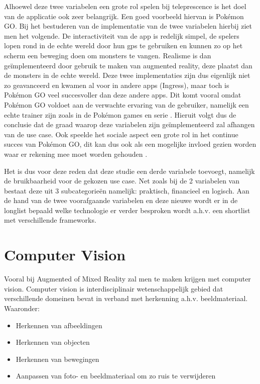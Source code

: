 Alhoewel deze twee variabelen een grote rol spelen bij teleprescence is het doel van de applicatie ook zeer belangrijk. Een goed voorbeeld hiervan is Pokémon GO. Bij het bestuderen van de implementatie van de twee variabelen hierbij ziet men het volgende. De interactiviteit van de app is redelijk simpel, de spelers lopen rond in de echte wereld door hun gps te gebruiken en kunnen zo op het scherm een beweging doen om monsters te vangen. Realisme is dan geïmplementeerd door gebruik te maken van augmented reality, deze plaatst dan de monsters in de echte wereld. Deze twee implementaties zijn dus eigenlijk niet zo geavanceerd en kwamen al voor in andere apps (Ingress), maar toch is Pokémon GO veel succesvoller dan deze andere apps. Dit komt vooral omdat Pokémon GO voldoet aan de verwachte ervaring van de gebruiker, namelijk een echte trainer zijn zoals in de Pokémon games en serie \autocite{Tang2017}. Hieruit volgt dus de conclusie dat de graad waarop deze variabelen zijn geïmplementeerd zal afhangen van de use case. Ook speelde het sociale aspect een grote rol in het continue succes van Pokémon GO, dit kan dus ook als een mogelijke invloed gezien worden waar er rekening mee moet worden gehouden \autocite{Tang2017}.


Het is dus voor deze reden dat deze studie een derde variabele toevoegt, namelijk de bruikbaarheid voor de gekozen use case. Net zoals bij de 2 variabelen van \textcite{Steuer1992} bestaat deze uit 3 subcategorieën namelijk: praktisch, financieel en logisch. Aan de hand van de twee voorafgaande variabelen en deze nieuwe wordt er in de longlist bepaald welke technologie er verder besproken wordt a.h.v. een shortlist met verschillende frameworks. 

\section{Computer Vision}
Vooral bij Augmented of Mixed Reality zal men te maken krijgen met computer vision. Computer vision is interdisciplinair wetenschappelijk gebied dat verschillende domeinen bevat in verband met herkenning a.h.v. beeldmateriaal. Waaronder: 

\begin{itemize}
    \item Herkennen van afbeeldingen
    \item Herkennen van objecten
    \item Herkennen van bewegingen
    \item Aanpassen van foto- en beeldmateriaal om zo ruis te verwijderen
\end{itemize}

